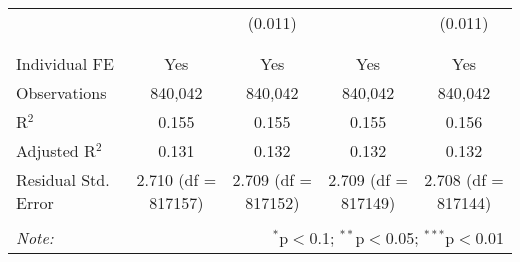 \documentclass[
]{article}
\begin{document}
\begin{table}[!htbp]
{\begin{tabular}{@{\extracolsep{5pt}}lcccc}
  &  & (0.011) &  & (0.011) \\ 
  & & & & \\ 
\hline \\[-1.8ex] 
Individual FE & Yes & Yes & Yes & Yes \\ 
Observations & 840,042 & 840,042 & 840,042 & 840,042 \\ 
R$^{2}$ & 0.155 & 0.155 & 0.155 & 0.156 \\ 
Adjusted R$^{2}$ & 0.131 & 0.132 & 0.132 & 0.132 \\ 
Residual Std. Error & 2.710 (df = 817157) & 2.709 (df = 817152) & 2.709 (df = 817149) & 2.708 (df = 817144) \\ 
\hline 
\hline \\[-1.8ex] 
\textit{Note:}  & \multicolumn{4}{r}{$^{*}$p$<$0.1; $^{**}$p$<$0.05; $^{***}$p$<$0.01} \\ 
\end{tabular}
} 
\end{table}
\end{document}
